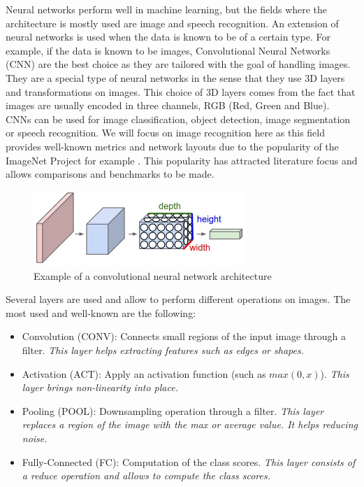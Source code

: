 Neural networks perform well in machine learning, but the fields where the architecture is mostly used are image and speech recognition. An extension of neural networks is used when the data is known to be of a certain type. For example, if the data is known to be images, Convolutional Neural Networks (CNN) are the best choice as they are tailored with the goal of handling images. They are a special type of neural networks in the sense that they use 3D layers and transformations on images. This choice of 3D layers comes from the fact that images are usually encoded in three channels, RGB (Red, Green and Blue). CNNs can be used for image classification, object detection, image segmentation or speech recognition. We will focus on image recognition here as this field provides well-known metrics and network layouts due to the popularity of the ImageNet Project for example \cite{ImageNet2009}. This popularity has attracted literature focus and allows comparisons and benchmarks to be made.

\begin{figure}[htbp]
	\centering
		\includegraphics[width=8cm]{Figures/CNN.png}
	\caption[Convolutional Neural Network Example]{Example of a convolutional neural network architecture \cite{Karpathy2015}}
	\label{fig:CNN}
\end{figure}

Several layers are used and allow to perform different operations on images. The most used and well-known are the following:
\begin{itemize}
  \item Convolution   (CONV): Connects small regions of the input image through a filter. \emph{This layer helps extracting features such as edges or shapes.}
  \item Activation     (ACT): Apply an activation function (such as $max(0,x)$). \emph{This layer brings non-linearity into place.}
  \item Pooling       (POOL): Downsampling operation through a filter. \emph{This layer replaces a region of the image with the max or average value. It helps reducing noise.}
  \item Fully-Connected (FC): Computation of the class scores. \emph{This layer consists of a reduce operation and allows to compute the class scores.}
\end{itemize}

